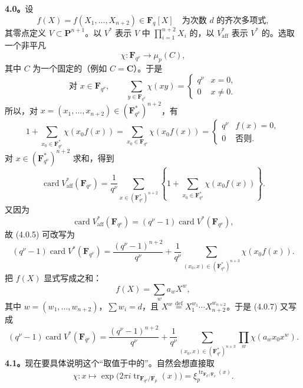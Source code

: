 \textbf{4.0。}设
\[
f(X)=f(X_1,\ldots,X_{n+2})\in\mathbf F_q[X]\quad\text{为次数 }d\text{ 的齐次多项式},\tag{4.0.1}
\]
其零点定义 $V\subset\mathbf P^{n+1}$。以 $V^*$ 表示 $V$ 中 $\prod_{i=1}^{n+2}X_i$ 的，以 $V^*_{\mathrm{aff}}$ 表示 $V^*$ 的。选取一个非平凡
\[
\chi:\mathbf F_{q^\nu}\longrightarrow\mu_p(C),\tag{4.0.2}
\]
其中 $C$ 为一个固定的（例如 $C=\mathbf C$）。于是
\[
\text{对 }x\in\mathbf F_{q^\nu},\qquad
\sum_{y\in\mathbf F_{q^\nu}}\chi(xy)=
\begin{cases}q^\nu&x=0,\\0&x\ne0.\end{cases}\tag{4.0.3}
\]
所以，对 $x=(x_1,\ldots,x_{n+2})\in(\mathbf F_{q^\nu}^{*})^{n+2}$，有
\[
1+\sum_{x_0\in\mathbf F_{q^\nu}^{*}}\chi(x_0f(x))
=\sum_{x_0\in\mathbf F_{q^\nu}}\chi(x_0f(x))
=\begin{cases}q^\nu&f(x)=0,\\0&\text{否则}.\end{cases}\tag{4.0.4}
\]
对 $x\in(\mathbf F_{q^\nu}^{*})^{n+2}$ 求和，得到
\[
\operatorname{card}V^*_{\mathrm{aff}}(\mathbf F_{q^\nu})
=\frac1{q^\nu}\sum_{x\in(\mathbf F_{q^\nu}^{*})^{n+2}}
\left\{1+\sum_{x_0\in\mathbf F_{q^\nu}^{*}}\chi(x_0f(x))\right\}.\tag{4.0.5}
\]
又因为
\[
\operatorname{card}V^*_{\mathrm{aff}}(\mathbf F_{q^\nu})
=(q^\nu-1)\operatorname{card}V^*(\mathbf F_{q^\nu}),\tag{4.0.6}
\]
故 (4.0.5) 可改写为
\[
(q^\nu-1)\operatorname{card}V^*(\mathbf F_{q^\nu})
=\frac{(q^\nu-1)^{n+2}}{q^\nu}
+\frac1{q^\nu}\sum_{(x_0,x)\in(\mathbf F_{q^\nu}^{*})^{n+3}}\chi(x_0f(x)).\tag{4.0.7}
\]
把 $f(X)$ 显式写成之和：
\[
f(X)=\sum_w a_wX^w,\tag{4.0.8}
\]
其中 $w=(w_1,\ldots,w_{n+2})$，$\sum w_i=d$，且 $X^w\overset{\mathrm{def}}=X_1^{w_1}\cdots X_{n+2}^{w_{n+2}}$。于是 (4.0.7) 又写成
\[
(q^\nu-1)\operatorname{card}V^*(\mathbf F_{q^\nu})
=\frac{(q^\nu-1)^{n+2}}{q^\nu}
+\frac1{q^\nu}\sum_{(x_0,x)\in(\mathbf F_{q^\nu}^{*})^{n+3}}\prod_w\chi(a_wx_0x^w).\tag{4.0.9}
\]
\textbf{4.1。}现在要具体说明这个“取值于中的”。自然会想直接取
\[
\chi:x\longmapsto\exp\bigl(2\pi i\operatorname{tr}_{\mathbf F_{q^\nu}/\mathbf F_p}(x)\bigr)
=\xi_p^{\operatorname{tr}_{\mathbf F_{q^\nu}/\mathbf F_p}(x)}.\tag{4.1.0}
\]
